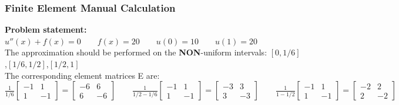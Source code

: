 \subsubsection{Finite Element Manual Calculation}
\textbf{Problem statement:} $u''(x)+f(x)=0\qquad f(x)=20\qquad u(0)=10\qquad u(1)=20$\\

The approximation should be performed on the \textbf{NON}-uniform intervals:
$[0,1/6]$,\quad $[1/6,1/2]$,\quad $[1/2,1]$\\

The corresponding element matrices E are:\\

$
	\frac{1}{1/6}\begin{bmatrix}
		-1 & 1\\
		1 & -1
	\end{bmatrix}=
	\begin{bmatrix}
			-6 & 6\\
			6 & -6
	\end{bmatrix}\qquad
	\frac{1}{1/2-1/6}\begin{bmatrix}
		-1 & 1\\
		1 & -1
	\end{bmatrix}=
	\begin{bmatrix}
		-3 & 3\\
		3 & -3
	\end{bmatrix}\qquad
	\frac{1}{1-1/2}\begin{bmatrix}
		-1 & 1\\
		1 & -1
	\end{bmatrix}=
	\begin{bmatrix}
		-2 & 2\\
		2 & -2
	\end{bmatrix}
$\\
\\

